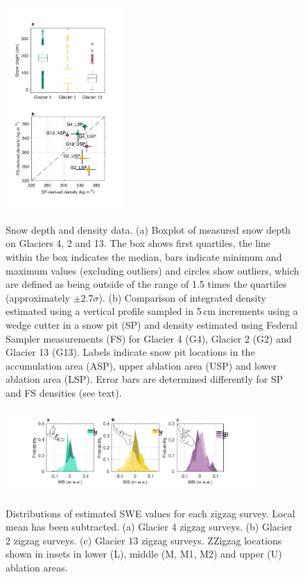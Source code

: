 \documentclass[twocolumn, letterpaper]{igs}
\begin{document}
\begin{figure}
	\centering
	\includegraphics[width =0.4\textwidth]{DepthBoxplot_SPvsFS.pdf}\\
	\caption{Snow depth and density data. (a) Boxplot of measured snow depth on Glaciers 4, 2 and 13. The box shows first quartiles, the line within the box indicates the median, bars indicate minimum and maximum values (excluding outliers) and circles show outliers, which are defined as being outside of the range of 1.5 times the quartiles (approximately $\pm2.7\sigma$). (b) Comparison of integrated density estimated using a vertical profile sampled in 5\,cm increments using a wedge cutter in a snow pit (SP) and density estimated using Federal Sampler measurements (FS) for Glacier 4 (G4), Glacier 2 (G2) and Glacier 13 (G13). Labels indicate snow pit locations in the accumulation area (ASP), upper ablation area (USP) and lower ablation area (LSP). Error bars are determined differently for SP and FS densities (see text).}
	\label{fig:DepthBoxplot_SPvsFS}
\end{figure}

\begin{figure}
	\centering
	\includegraphics[width =0.85\textwidth]{ZigzagHistogram.pdf}\\
	\caption{Distributions of estimated SWE values for each zigzag survey. Local mean has been subtracted. (a) Glacier 4 zigzag surveys. (b) Glacier 2 zigzag surveys. (c) Glacier 13 zigzag surveys.
	 ZZigzag locations shown in insets in lower (L), middle (M, M1, M2) and upper (U) ablation areas.}
	\label{fig:ZigzagHistogram}
\end{figure}
\end{document}
